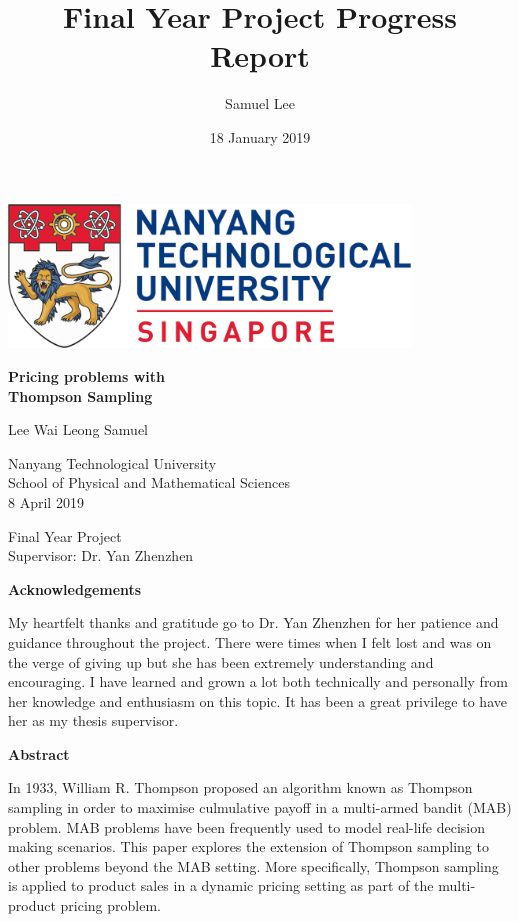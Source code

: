 \documentclass[a4paper]{article}
\title{Final Year Project Progress Report}
\author{Samuel Lee}
\date{18 January 2019}
\begin{document}
\begin{titlepage}
	\begin{center}
		
		\includegraphics[width=0.8\textwidth]{NTU.png}
		\vspace{2cm}
		
		\huge
		
		\textbf{Pricing problems with \\Thompson Sampling}
		
		\vspace{1cm}
		\Large
		Lee Wai Leong Samuel
		
		\vspace{2cm}
		\Large
		Nanyang Technological University\\
		School of Physical and Mathematical Sciences\\
		8 April 2019
		
		\vfill
		
		Final Year Project\\
		Supervisor: Dr. Yan Zhenzhen
		
		\vspace{0.8cm}
		
	\end{center}
\end{titlepage}

\begin{center}
	\renewcommand{\baselinestretch}{1.5}
	\large
	\textbf{Acknowledgements}
	\vspace{1cm}
	
	My heartfelt thanks and gratitude go to Dr. Yan Zhenzhen for her patience and guidance throughout the project. There were times when I felt lost and was on the verge of giving up but she has been extremely understanding and encouraging. I have learned and grown a lot both technically and personally from her knowledge and enthusiasm on this topic. It has been a great privilege to have her as my thesis supervisor.
\end{center}
\pagebreak
\begin{center}
	\renewcommand{\baselinestretch}{1.5}
	\large
	\textbf{Abstract}
	\vspace{1cm}
	
	
	In 1933, William R. Thompson proposed an algorithm known as Thompson sampling in order to maximise culmulative payoff in a multi-armed bandit (MAB) problem. MAB problems have been frequently used to model real-life decision making scenarios. This paper explores the extension of Thompson sampling to other problems beyond the MAB setting. More specifically, Thompson sampling is applied to product sales in a dynamic pricing setting as part of the multi-product pricing problem. 
\end{center}
\pagebreak
\large
\renewcommand{\baselinestretch}{1.5}
\tableofcontents
\end{document}
